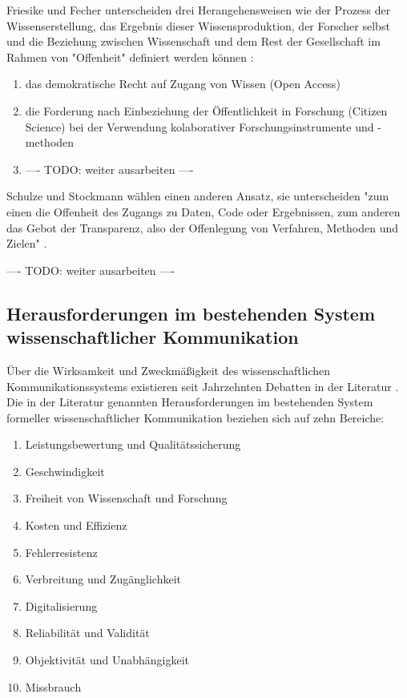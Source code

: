 Friesike und Fecher unterscheiden drei Herangehensweisen wie der Prozess der Wissenserstellung, das Ergebnis dieser Wissensproduktion, der Forscher selbst und die Beziehung zwischen Wissenschaft und dem Rest der Gesellschaft im Rahmen von "Offenheit" definiert werden können \cite{cite:9}:
\begin{enumerate}
\item das demokratische Recht auf Zugang von Wissen (Open Access)
\item die Forderung nach Einbeziehung der Öffentlichkeit in Forschung (Citizen Science) bei der Verwendung kolaborativer Forschungsinstrumente und -methoden
\item ---- TODO: weiter ausarbeiten ----
\end{enumerate}

Schulze und Stockmann wählen einen anderen Ansatz, sie unterscheiden "zum einen die Offenheit des Zugangs zu Daten, Code oder Ergebnissen, zum anderen das Gebot der Transparenz, also der Offenlegung von Verfahren, Methoden und Zielen" \cite{schulze_2013_open}.

---- TODO: weiter ausarbeiten ----

\subsection{Herausforderungen im bestehenden System wissenschaftlicher Kommunikation}

Über die Wirksamkeit und Zweckmäßigkeit des wissenschaftlichen Kommunikationssystems existieren seit Jahrzehnten Debatten in der Literatur \cite{suchen}. Die in der Literatur genannten Herausforderungen im bestehenden System formeller wissenschaftlicher Kommunikation beziehen sich auf zehn Bereiche:
\begin{enumerate}
\item Leistungsbewertung und Qualitätssicherung
\item Geschwindigkeit
\item Freiheit von Wissenschaft und Forschung
\item Kosten und Effizienz
\item Fehlerresistenz
\item Verbreitung und Zugänglichkeit
\item Digitalisierung
\item Reliabilität und Validität
\item Objektivität und Unabhängigkeit
\item Missbrauch
\end{enumerate}

